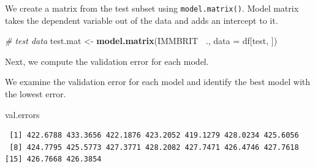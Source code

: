 \documentclass[]{article}
\newenvironment{Shaded}{\begin{snugshade}}{\end{snugshade}}
\newcommand{\CommentTok}[1]{\textcolor[rgb]{0.56,0.35,0.01}{\textit{#1}}}
\newcommand{\ControlFlowTok}[1]{\textcolor[rgb]{0.13,0.29,0.53}{\textbf{#1}}}
\newcommand{\DataTypeTok}[1]{\textcolor[rgb]{0.13,0.29,0.53}{#1}}
\newcommand{\DecValTok}[1]{\textcolor[rgb]{0.00,0.00,0.81}{#1}}
\newcommand{\KeywordTok}[1]{\textcolor[rgb]{0.13,0.29,0.53}{\textbf{#1}}}
\newcommand{\NormalTok}[1]{#1}
\newcommand{\OperatorTok}[1]{\textcolor[rgb]{0.81,0.36,0.00}{\textbf{#1}}}
\newcommand{\OtherTok}[1]{\textcolor[rgb]{0.56,0.35,0.01}{#1}}
\newcommand{\StringTok}[1]{\textcolor[rgb]{0.31,0.60,0.02}{#1}}
\begin{document}
We create a matrix from the test subset using \texttt{model.matrix()}. Model matrix takes the dependent variable out of the data and adds an intercept to it.

\begin{Shaded}
\begin{Highlighting}[]
\CommentTok{# test data}
\NormalTok{test.mat <-}\StringTok{ }\KeywordTok{model.matrix}\NormalTok{(IMMBRIT }\OperatorTok{~}\NormalTok{., }\DataTypeTok{data =}\NormalTok{ df[test, ])}
\end{Highlighting}
\end{Shaded}

Next, we compute the validation error for each model.

\begin{Shaded}
\end{Shaded}

We examine the validation error for each model and identify the best model with the lowest error.

\begin{Shaded}
\begin{Highlighting}[]
\NormalTok{val.errors}
\end{Highlighting}
\end{Shaded}

\begin{verbatim}
 [1] 422.6788 433.3656 422.1876 423.2052 419.1279 428.0234 425.6056
 [8] 424.7795 425.5773 427.3771 428.2082 427.7471 426.4746 427.7618
[15] 426.7668 426.3854
\end{verbatim}
\end{document}
